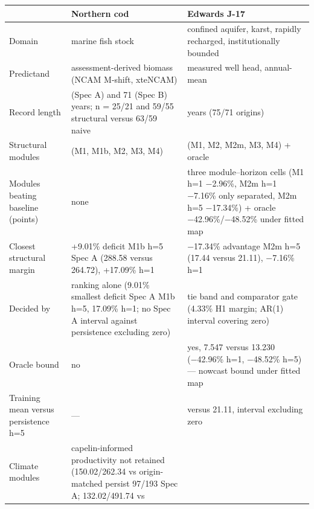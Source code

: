 \documentclass[11pt]{article}
\begin{document}
{\def\LTcaptype{none} %
\begin{longtable}[]{@{}
  >{\raggedright\arraybackslash}p{}
  >{\raggedright\arraybackslash}p{}
  >{\raggedright\arraybackslash}p{}@{}}
\toprule\noalign{}
\begin{minipage}[b]{\linewidth}\raggedright
\end{minipage} & \begin{minipage}[b]{\linewidth}\raggedright
Northern cod
\end{minipage} & \begin{minipage}[b]{\linewidth}\raggedright
Edwards J-17
\end{minipage} \\
\midrule\noalign{}
\endhead
\bottomrule\noalign{}
\endlastfoot
Domain & marine fish stock & confined aquifer, karst, rapidly recharged,
institutionally bounded \\
Predictand & assessment-derived biomass (NCAM M-shift, xteNCAM) &
measured well head, annual-mean \\
Record length & 33 (Spec A) and 71 (Spec B) years; n = 25/21 and 59/55
structural versus 63/59 naive & 90 years (75/71 origins) \\
Structural modules & 5 (M1, M1b, M2, M3, M4) & 5 (M1, M2, M2m, M3, M4) +
oracle \\
Modules beating baseline (points) & none & three module--horizon cells
(M1 h=1 −2.96\%, M2m h=1 −7.16\% only separated, M2m h=5 −17.34\%) +
oracle −42.96\%/−48.52\% under fitted map \\
Closest structural margin & +9.01\% deficit M1b h=5 Spec A (288.58
versus 264.72), +17.09\% h=1 & −17.34\% advantage M2m h=5 (17.44 versus
21.11), −7.16\% h=1 \\
Decided by & ranking alone (9.01\% smallest deficit Spec A M1b h=5,
17.09\% h=1; no Spec A interval against persistence excluding zero) &
tie band and comparator gate (4.33\% H1 margin; AR(1) interval covering
zero) \\
Oracle bound & no & yes, 7.547 versus 13.230 (−42.96\% h=1, −48.52\%
h=5) --- nowcast bound under fitted map \\
Training mean versus persistence h=5 & --- & 16.80 versus 21.11,
interval excluding zero \\
Climate modules & capelin-informed productivity not retained
(150.02/262.34 vs origin-matched persist 97/193 Spec A; 132.02/491.74 vs

\end{longtable}}
\end{document}

